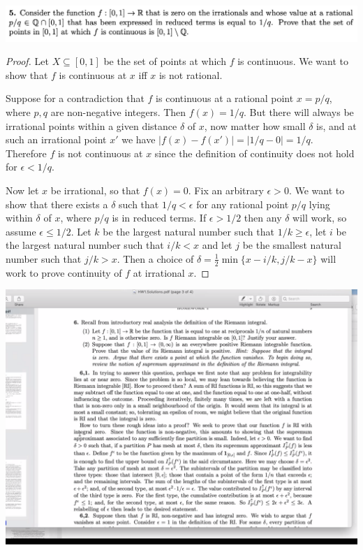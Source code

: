 \newpage
\begin{mdframed}
  \includegraphics[width=400pt]{img/analysis--berkeley-202a--homework-1-5192.png}
\end{mdframed}



\begin{proof}
  Let $X \subseteq [0, 1]$ be the set of points at which $f$ is continuous. We want to show that $f$ is
  continuous at $x$ iff $x$ is not rational.

  Suppose for a contradiction that $f$ is continuous at a rational point $x = p/q$, where $p, q$ are
  non-negative integers. Then $f(x) = 1/q$. But there will always be irrational points within a given
  distance $\delta$ of $x$, now matter how small $\delta$ is, and at such an irrational point $x'$ we
  have $|f(x) - f(x')| = |1/q - 0| = 1/q$. Therefore $f$ is not continuous at $x$ since the definition of
  continuity does not hold for $\epsilon < 1/q$.

  Now let $x$ be irrational, so that $f(x) = 0$. Fix an arbitrary $\epsilon > 0$. We want to show that there
  exists a $\delta$ such that $1/q < \epsilon$ for any rational point $p/q$ lying within $\delta$ of $x$,
  where $p/q$ is in reduced terms. If $\epsilon > 1/2$ then any $\delta$ will work, so
  assume $\epsilon \leq 1/2$. Let $k$ be the largest natural number such that $1/k \geq \epsilon$, let $i$ be
  the largest natural number such that $i/k < x$ and let $j$ be the smallest natural number such
  that $j/k > x$. Then a choice of $\delta = \frac{1}{2}\min\{x - i/k, j/k - x\}$ will work to prove continuity
  of $f$ at irrational $x$.
\end{proof}


\begin{mdframed}
  \includegraphics[width=400pt]{img/analysis--berkeley-202a-hw-af4c.png}
\end{mdframed}


